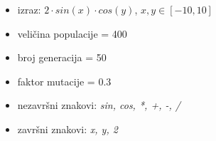 \documentclass{beamer}
\begin{document}
\begin{frame}
\begin{figure}[!htb]
{}
\endminipage
\end{figure}

\begin{itemize}
\item{izraz: $2 \cdot sin(x) \cdot cos(y)$, $x, y \in [-10, 10]$}
\item{veličina populacije = 400}
\item{broj generacija = 50}
\item{faktor mutacije = 0.3}
\item{nezavršni znakovi: \textit{sin, cos, *, +, -, /}}
\item{završni znakovi: \textit{x, y, 2}}
\end{itemize}
\end{frame}

\end{document}

